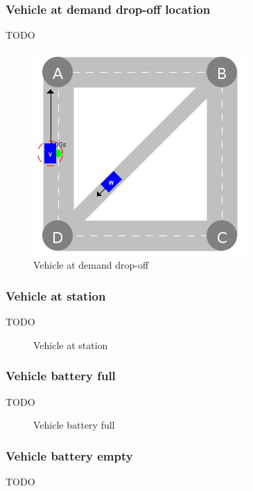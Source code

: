 \documentclass{IEEEtran}
\begin{document}
    \subsubsection{Vehicle at demand drop-off location}
    TODO

    \begin{figure}[htbp]
        \centering
        \includegraphics[scale=0.5]{../../events/vehicle-at-demand-drop-off.png}
        \caption{Vehicle at demand drop-off}
        \label{fig:vehicle-at-demand-drop-off}
    \end{figure}

    \subsubsection{Vehicle at station}
    TODO

    \begin{figure}[htbp]
        \centering
        \caption{Vehicle at station}
        \label{fig:vehicle-at-station}
    \end{figure}

    \subsubsection{Vehicle battery full}
    TODO

    \begin{figure}[htbp]
        \centering
        \caption{Vehicle battery full}
        \label{fig:vehicle-battery-full}
    \end{figure}

    \subsubsection{Vehicle battery empty}
    TODO
\end{document}
